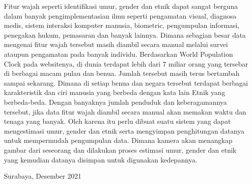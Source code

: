   Fitur wajah seperti identifikasi umur, gender dan etnik dapat sangat berguna dalam banyak pengimplementasian ilmu seperti pengamatan visual, diagnosa medis, sistem interaksi komputer manusia, biometric, pengumpulan informasi, penegakan hukum, pemasaran dan banyak lainnya. Dimana sebagian besar data mengenai fitur wajah tersebut masih diambil secara manual melalui survei ataupun pengamatan pada banyak individu. Berdasarkan World Population Clock pada websitenya, di dunia terdapat lebih dari 7 miliar orang yang tersebar di berbagai macam pulau dan benua. Jumlah tersebut masih terus bertambah sampai sekarang. Dimana di setiap benua dan negara tersebut terdapat berbagai karakteristik dan ciri manusia yang berbeda dengan kata lain Etnik yang berbeda-beda. Dengan banyaknya jumlah penduduk dan keberagamannya tersebut, jika data fitur wajah diambil secara manual akan memakan waktu dan tenaga yang banyak. Oleh karena itu perlu dibuat suatu sistem yang dapat mengestimasi umur, gender dan etnik serta mengyimpan penghitungan datanya untuk mempermudah pengumpulan data. Dimana kamera akan menangkap gambar dari seseorang dan dilakukan proses estimasi umur, gender dan etnik yang kemudian datanya disimpan untuk digunakan kedepannya.
  \vspace{1ex}
  
  \begin{flushright}
    Surabaya, Desember 2021
  \end{flushright}
  \vspace{1ex}
  
